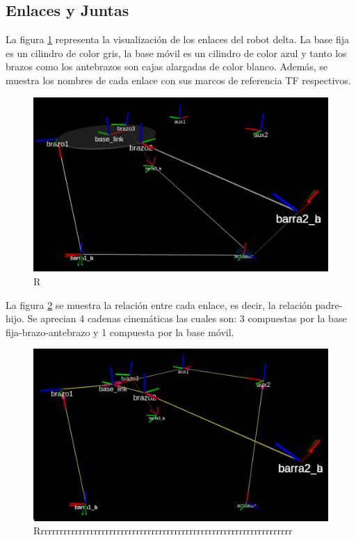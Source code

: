 \newpage

    \subsection{Enlaces y Juntas}\label{enalcesyjuntas_cap7}
        La figura \ref{f:cap7_rviz_2} representa la visualización de los enlaces del robot delta. La base fija es un cilindro de color gris, la base móvil es un cilindro de color azul y tanto los brazos como los antebrazos son cajas alargadas de color blanco. Además, se muestra los nombres de cada enlace con sus marcos de referencia TF respectivos.
        \begin{figure}[h]
            \centering
            \includegraphics[width=0.8\linewidth]{Main/Chapter7/Images7/rviz_2.png}
            \caption{R}
            \label{f:cap7_rviz_2}
        \end{figure}  
        
    La figura \ref{f:cap7_rviz_3} se muestra la relación entre cada enlace, es decir, la relación padre-hijo. Se aprecian 4 cadenas cinemáticas las cuales son: 3 compuestas por la base fija-brazo-antebrazo y 1 compuesta por la base móvil.    
    \begin{figure}[h]
            \centering
            \includegraphics[width=0.8\linewidth]{Main/Chapter7/Images7/rviz_3.png}
            \caption{Rrrrrrrrrrrrrrrrrrrrrrrrrrrrrrrrrrrrrrrrrrrrrrrrrrrrrrrrrrrrrrrrrrr}
            \label{f:cap7_rviz_3}
        \end{figure}  

